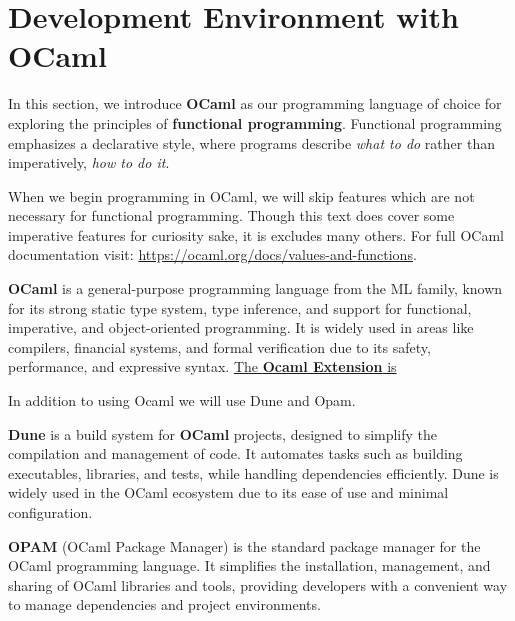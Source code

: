 
\newpage 
\section{Development Environment with OCaml}

In this section, we introduce \textbf{OCaml} as our programming language of choice for exploring
the principles of \textbf{functional programming}. Functional programming emphasizes a declarative
style, where programs describe \textit{what to do} rather than imperatively, \textit{how to do it}.

When we begin programming in OCaml, we will skip features which are not necessary for 
functional programming. Though this text does cover some imperative features for curiosity sake, it is excludes 
many others. For full OCaml documentation visit: \href{https://ocaml.org/docs/values-and-functions}{https://ocaml.org/docs/values-and-functions}.


\begin{Def}[OCaml]

	\textbf{OCaml} is a general-purpose programming language from the ML family,
	known for its strong static type system, type inference, and support for functional,
	imperative, and object-oriented programming. It is widely used in areas like compilers,
	financial systems, and formal verification due to its safety, performance,
	and expressive syntax. \underline{ The \textbf{Ocaml Extension} is }
\end{Def}

\noindent
In addition to using Ocaml we will use Dune and Opam.
\begin{Def}[Dune]

	\textbf{Dune} is a build system for \textbf{OCaml} projects, designed to simplify
	the compilation and management of code. It automates tasks such as building executables,
	libraries, and tests, while handling dependencies efficiently. Dune is widely used in the
	OCaml ecosystem due to its ease of use and minimal configuration.

\end{Def}

\begin{Def}[OPAM]

	\textbf{OPAM} (OCaml Package Manager) is the standard package manager for the OCaml programming
	language. It simplifies the installation, management, and sharing of OCaml libraries and tools,
	providing developers with a convenient way to manage dependencies and project environments.
\end{Def}

